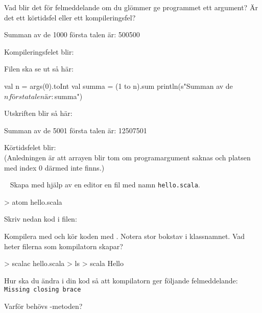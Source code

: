 \Subtask Vad blir det för felmeddelande om du glömmer ge programmet ett argument? Är det ett körtidsfel eller ett kompileringsfel?

\SOLUTION

\TaskSolved \what

\SubtaskSolved
\begin{REPL}
Summan av de 1000 första talen är: 500500
\end{REPL}

\SubtaskSolved  Kompileringsfelet blir: 

\SubtaskSolved  Filen ska se ut så här:
\begin{Code}
val n = args(0).toInt
val summa = (1 to n).sum
println(s"Summan av de $n första talen är: $summa")
\end{Code}

Utskriften blir så här:
\begin{REPL}
Summan av de 5001 första talen är: 12507501
\end{REPL}

\SubtaskSolved Körtidsfelet blir: \\(Anledningen är att arrayen  blir tom om programargument saknas och platsen med index $0$ därmed inte finns.)

\QUESTEND






\QUESTBEGIN

\Task  \what~  Skapa med hjälp av en editor en fil med namn \texttt{hello.scala}.
\begin{REPLnonum}
> atom hello.scala
\end{REPLnonum}
Skriv nedan kod i filen:



\Subtask Kompilera med  och kör koden med . Notera stor bokstav i klassnamnet. Vad heter filerna som kompilatorn skapar?
\begin{REPLnonum}
> scalac hello.scala
> ls
> scala Hello
\end{REPLnonum}

\Subtask Hur ska du ändra i din kod så att kompilatorn ger följande felmeddelande: \\
\texttt{Missing closing brace}

\Subtask Varför behövs -metoden?

